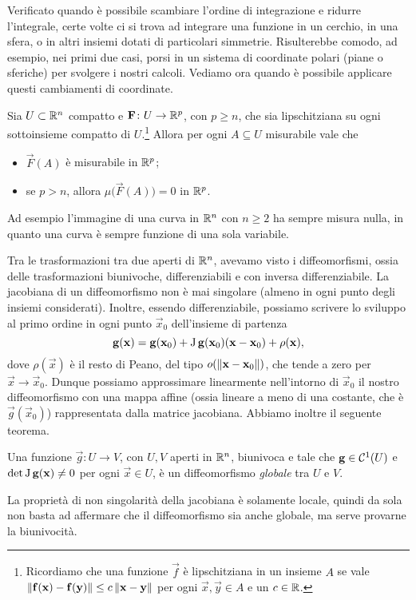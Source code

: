 Verificato quando è possibile scambiare l'ordine di integrazione e ridurre l'integrale, certe volte ci si trova ad integrare una funzione in un cerchio, in una sfera, o in altri insiemi dotati di particolari simmetrie.
Risulterebbe comodo, ad esempio, nei primi due casi, porsi in un sistema di coordinate polari (piane o sferiche) per svolgere i nostri calcoli.
Vediamo ora quando è possibile applicare questi cambiamenti di coordinate.
\begin{teorema}
	Sia $U\subset\mathbb{R}^n$ compatto e $\mathbf{F}\colon U\to\mathbb{R}^p$, con $p\geq n$, che sia lipschitziana su ogni sottoinsieme compatto di $U$.\footnote{Ricordiamo che una funzione $\vec f$ è lipschitziana in un insieme $A$ se vale $\left\|{\mathbf{f}(\mathbf{x})-\mathbf{f}(\mathbf{y})}\right\|\leq c\left\|{\mathbf{x}-\mathbf{y}}\right\|$ per ogni $\vec x,\vec y\in A$ e un $c\in\mathbb{R}$.}
	Allora per ogni $A\subseteq U$ misurabile vale che
	\begin{itemize}
		\item $\vec F(A)$ è misurabile in $\mathbb{R}^p$;
		\item se $p>n$, allora $\mu\big(\vec F(A)\big)=0$ in $\mathbb{R}^p$.
	\end{itemize}
\end{teorema}
Ad esempio l'immagine di una curva in $\mathbb{R}^n$ con $n\geq 2$ ha sempre misura nulla, in quanto una curva è sempre funzione di una sola variabile.

Tra le trasformazioni tra due aperti di $\mathbb{R}^n$, avevamo visto i diffeomorfismi, ossia delle trasformazioni biunivoche, differenziabili e con inversa differenziabile. La jacobiana di un diffeomorfismo non è mai singolare (almeno in ogni punto degli insiemi considerati).
Inoltre, essendo differenziabile, possiamo scrivere lo sviluppo al primo ordine in ogni punto $\vec x_0$ dell'insieme di partenza
\begin{equation}
	\mathbf{g}(\mathbf{x})=\mathbf{g}(\mathbf{x}_0)+\operatorname{J}\mathbf{g}(\mathbf{x}_0)(\mathbf{x}-\mathbf{x}_0)+\rho(\mathbf{x}),
\end{equation}
dove $\rho(\vec x)$ è il resto di Peano, del tipo $o(\left\|{\mathbf{x}-\mathbf{x}_0}\right\|)$, che tende a zero per $\vec x\to\vec x_0$.
Dunque possiamo approssimare linearmente nell'intorno di $\vec x_0$ il nostro diffeomorfismo con una mappa affine (ossia lineare a meno di una costante, che è $\vec g(\vec x_0)$) rappresentata dalla matrice jacobiana.
Abbiamo inoltre il seguente teorema.
\begin{teorema} \label{t:diffeomorfismo-globale}
	Una funzione $\vec g\colon U\to V$, con $U,V$ aperti in $\mathbb{R}^n$, biunivoca e tale che $\mathbf{g}\in\mathcal{C}^{{1}}(U)$ e $\det\operatorname{J}\mathbf{g}(\mathbf{x})\neq 0$ per ogni $\vec x\in U$, è un diffeomorfismo \emph{globale} tra $U$ e $V$.
\end{teorema}
La proprietà di non singolarità della jacobiana è solamente locale, quindi da sola non basta ad affermare che il diffeomorfismo sia anche globale, ma serve provarne la biunivocità.

